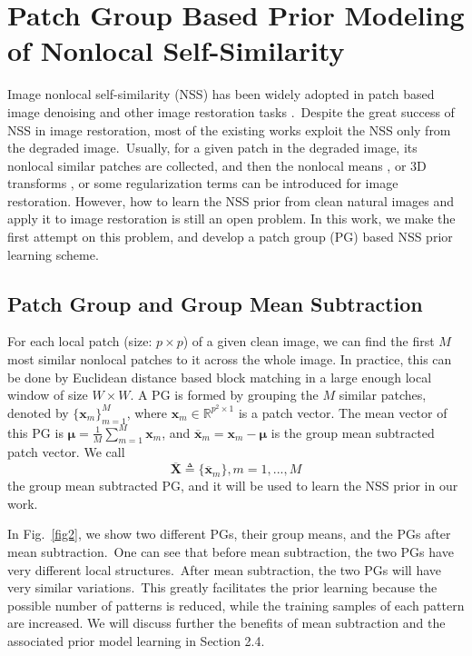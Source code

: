 \section{Patch Group Based Prior Modeling of Nonlocal Self-Similarity}
Image nonlocal self-similarity (NSS) has been widely adopted in patch based image denoising and other image restoration tasks \cite{nlm,bm3d,lssc,ncsr,wnnm}.\ Despite the great success of NSS in image restoration, most of the existing works exploit the NSS only from the degraded image.\ Usually, for a given patch in the degraded image, its nonlocal similar patches are collected, and then the nonlocal means \cite{nlm}, or 3D transforms \cite{bm3d}, or some regularization terms \cite{lssc,ncsr,wnnm,srcolor} can be introduced for image restoration. However, how to learn the NSS prior from clean natural images and apply it to image restoration is still an open problem. In this work, we make the first attempt on this problem, and develop a patch group (PG) based NSS prior learning scheme.  
\subsection{Patch Group and Group Mean Subtraction}
For each local patch (size: $p\times p$) of a given clean image, we can find the first $M$ most similar nonlocal patches to it across the whole image. In practice, this can be done by Euclidean distance based block matching in a large enough local window of size $W\times W$. A PG is formed by grouping the $M$ similar patches, denoted by $\{\bm{x}_{m}\}_{m=1}^{M}$, where $\bm{x}_{m}\in \mathbb{R}^{p^{2}\times1}$ is a patch vector. The mean vector of this PG is $\bm{\mu}=\frac{1}{M}\sum_{m=1}^{M}\bm{x}_{m}$, and $\bm{\overline{x}}_{m}=\bm{x}_{m}-\bm{\mu}$ is the group mean subtracted patch vector. We call
\begin{equation}
\label{equ1}
\overline{\bm{X}}\triangleq \{\overline{\bm{x}}_{m}\}, m=1,...,M
\end{equation}
the group mean subtracted PG, and it will be used to learn the NSS prior in our work. 

In Fig.\ \ref{fig2}, we show two different PGs, their group means, and the PGs after mean subtraction.\ One can see that before mean subtraction, the two PGs have very different local structures.\ After mean subtraction, the two PGs will have very similar variations.\ This greatly facilitates the prior learning because the possible number of patterns is reduced, while the training samples of each pattern are increased. We will discuss further the benefits of mean subtraction and the associated prior model learning in Section 2.4.   
